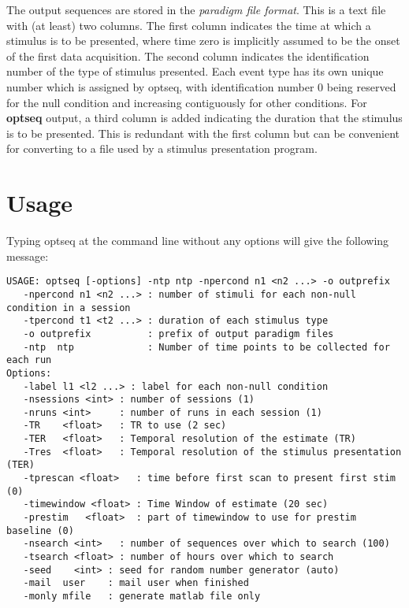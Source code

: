 \documentclass[10pt]{article}
\begin{document}
The output sequences are stored in the {\em paradigm file format}.
This is a text file with (at least) two columns.  The first column
indicates the time at which a stimulus is to be presented, where time
zero is implicitly assumed to be the onset of the first data
acquisition. The second column indicates the identification number of
the type of stimulus presented.  Each event type has its own unique
number which is assigned by optseq, with identification number 0 being
reserved for the null condition and increasing contiguously for other
conditions.  For {\bf optseq} output, a third column is added
indicating the duration that the stimulus is to be presented.  This is
redundant with the first column but can be convenient for converting
to a file used by a stimulus presentation program.\\

\section{Usage}
Typing optseq at the command line without any options will give the
following message:\\ 

\begin{small}
\begin{verbatim}
USAGE: optseq [-options] -ntp ntp -npercond n1 <n2 ...> -o outprefix
   -npercond n1 <n2 ...> : number of stimuli for each non-null condition in a session
   -tpercond t1 <t2 ...> : duration of each stimulus type 
   -o outprefix          : prefix of output paradigm files 
   -ntp  ntp             : Number of time points to be collected for each run
Options:
   -label l1 <l2 ...> : label for each non-null condition
   -nsessions <int> : number of sessions (1)
   -nruns <int>     : number of runs in each session (1)
   -TR    <float>   : TR to use (2 sec)
   -TER   <float>   : Temporal resolution of the estimate (TR)
   -Tres  <float>   : Temporal resolution of the stimulus presentation (TER)
   -tprescan <float>   : time before first scan to present first stim (0)
   -timewindow <float> : Time Window of estimate (20 sec)
   -prestim   <float>  : part of timewindow to use for prestim baseline (0)
   -nsearch <int>   : number of sequences over which to search (100)
   -tsearch <float> : number of hours over which to search 
   -seed    <int> : seed for random number generator (auto)
   -mail  user    : mail user when finished
   -monly mfile   : generate matlab file only
\end{verbatim}
\end{small}
\end{document}
